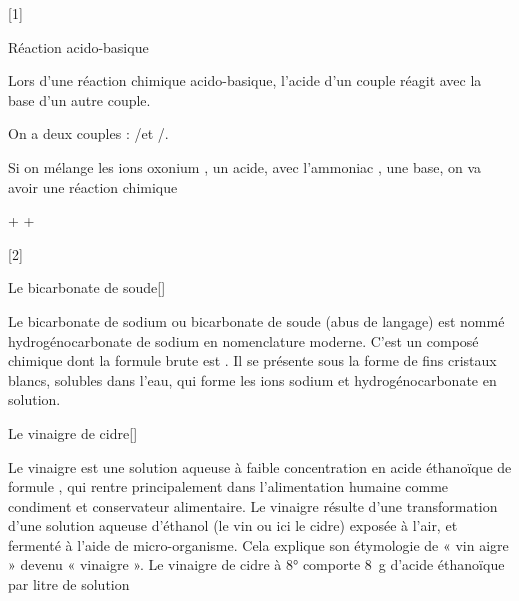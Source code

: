 [1]

\begin{doc}{Réaction acido-basique}
  \begin{importants}  
    Lors d'une réaction chimique acido-basique, l'acide d'un couple réagit avec la base d'un autre couple.
  \end{importants}
  
  \exemple On a deux couples : \oxonium/\eau et \ammonium/\ammoniac.

  Si on mélange les ions oxonium , un acide, avec l'ammoniac \ammoniac, une base, on va avoir une réaction chimique
  \vspace*{-12pt}
  \begin{center}
    \oxonium + \ammoniac \reaction \eau + \ammonium
  \end{center}
\end{doc}

[2]

\pasCorrection{\newpage\vspace*{-40pt}}
\begin{doc}{Le bicarbonate de soude}[\label{doc:bicarbonate}]
  \begin{figure}
    \vspace*{-38pt}
    \centering
  \end{figure}
  Le bicarbonate de sodium ou bicarbonate de soude (abus de langage) est nommé hydrogénocarbonate de sodium en nomenclature moderne.
  C’est un composé chimique dont la formule brute est \bicarbonateDeSodium.
  Il se présente sous la forme de fins cristaux blancs, solubles dans l’eau, qui forme les ions sodium \ionSodium et hydrogénocarbonate \bicarbonate en solution.
\end{doc}

\begin{doc}{Le vinaigre de cidre}[\label{doc:vinaigre}]
  \begin{figure}
    \vspace*{-22pt}
    \centering
  \end{figure}
  Le vinaigre est une solution aqueuse à faible concentration en acide éthanoïque de
  formule , qui rentre principalement dans l'alimentation humaine comme condiment et conservateur alimentaire. 
  Le vinaigre résulte d'une transformation d'une solution aqueuse d'éthanol (le vin ou ici le cidre) exposée à l'air, et fermenté à l’aide de micro-organisme.
  Cela explique son étymologie de « vin aigre » devenu « vinaigre ».
  Le vinaigre de cidre à 8° comporte \qty{8}{\g} d’acide éthanoïque par litre de solution
\end{doc}

